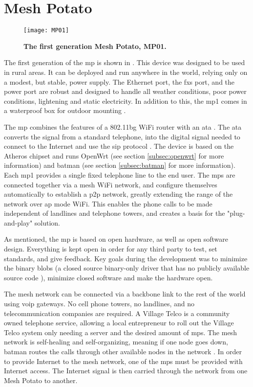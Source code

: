\section{Mesh Potato}

\begin{figure}[b]
  \centering
      \texttt{[image: MP01]}
  \caption [MP01]{\textbf{The first generation Mesh Potato, MP01.}}
  \label{fig:MP01}
\end{figure}

The first generation of the \gls{mp} is shown in . This device was designed to be used in rural areas. It can be deployed and run anywhere in the world, relying only on a modest, but stable, power supply. The Ethernet port, the \gls{fxs} port, and the power port are robust and designed to handle all weather conditions, poor power conditions, lightening and static electricity. In addition to this, the \gls{mp1} comes in a waterproof box for outdoor mounting \cite{background}.

The \gls{mp} combines the features of a 802.11bg WiFi router with an \gls{ata} \cite{MP}. The \gls{ata} converts the signal from a standard telephone, into the digital signal needed to connect to the Internet and use the \gls{sip} protocol \cite{MParticle}. The device is based on the Atheros chipset and runs OpenWrt (see section \ref{subsec:openwrt} for more information) and \gls{batman} (see section \ref{subsec:batman} for more information). Each \gls{mp1} provides a single fixed telephone line to the end user. The \glspl{mp} are connected together via a mesh WiFi network, and configure themselves automatically to establish a \gls{p2p} network, greatly extending the range of the network over \gls{ap} mode WiFi. This enables the phone calls to be made independent of landlines and telephone towers, and creates a basis for the "plug-and-play" solution. 

As mentioned, the \gls{mp} is based on open hardware, as well as open software design. Everything is kept open in order for any third party to test, set standards, and give feedback. Key goals during the development was to minimize the binary blobs (a closed source binary-only driver that has no publicly available source code \cite{binaryBolb}), minimize closed software and make the hardware open. 

The mesh network can be connected via a backbone link to the rest of the world using \gls{voip} gateways. No cell phone towers, no landlines, and no telecommunication companies are required. A Village Telco is a community owned telephone service, allowing a local entrepreneur to roll out the Village Telco system only needing a server and the desired amount of \glspl{mp}. The mesh network is self-healing and self-organizing, meaning if one node goes down, \gls{batman} routes the calls through other available nodes in the network \cite{MPbyRowe}. In order to provide Internet to the mesh network, one of the \glspl{mp} must be provided with Internet access. The Internet signal is then carried through the network from one Mesh Potato to another. 


